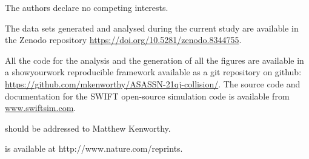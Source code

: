 \documentclass[sn-nature,oneside]{sn-jnl}%
\begin{document}
 The authors declare no competing interests.

The data sets generated and analysed during the current study are available in the Zenodo repository \url{https://doi.org/10.5281/zenodo.8344755}.

All the code for the analysis and the generation of all the figures  are available in a showyourwork \citep{Luger2021} reproducible framework available as a git repository on github: \url{https://github.com/mkenworthy/ASASSN-21qj-collision/}.
%
The source code and documentation for the SWIFT open-source simulation code is available from \url{www.swiftsim.com}.

should be addressed to Matthew Kenworthy.

 is available at http://www.nature.com/reprints.
\newpage


\end{document}
